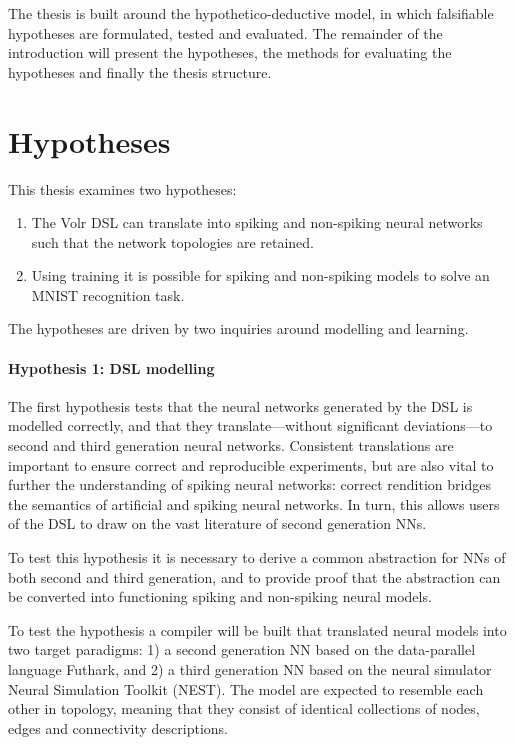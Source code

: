 The thesis is built around the hypothetico-deductive model, in which 
falsifiable hypotheses are formulated, tested and evaluated.
The remainder of the introduction will present the hypotheses, the methods for
evaluating the hypotheses and finally the thesis structure.

\section{Hypotheses} \label{sec:hypotheses}
This thesis examines two hypotheses:

\begin{enumerate}
  \item The Volr DSL can translate into spiking and non-spiking neural networks such that the network topologies are retained.
  \item Using training it is possible for spiking and non-spiking models to solve an MNIST recognition task.
\end{enumerate}

The hypotheses are driven by two inquiries around modelling and learning.

\paragraph{Hypothesis 1: DSL modelling}
The first hypothesis tests that the neural networks generated by the DSL is
modelled correctly, and that they translate---without significant
deviations---to second and third generation neural networks.
Consistent translations are important to ensure correct and reproducible experiments,
but are also vital to further the understanding of spiking neural networks:
correct rendition bridges the semantics of artificial and spiking neural networks.
In turn, this allows users of the DSL to draw on the vast literature of
second generation \gls{NN}s.

To test this hypothesis it is necessary to derive a common abstraction for
\glspl{NN} of both second and third generation, and to provide proof that the
abstraction can be converted into functioning spiking and non-spiking neural
models.

To test the hypothesis a compiler will be built that translated neural models
into two target paradigms:
  1) a second generation \gls{NN} based on the data-parallel language Futhark, and
  2) a third generation \gls{NN} based on the neural simulator Neural Simulation
  Toolkit (NEST).
The model are expected to resemble each other in topology, meaning that they
consist of identical collections of nodes, edges and connectivity descriptions.

